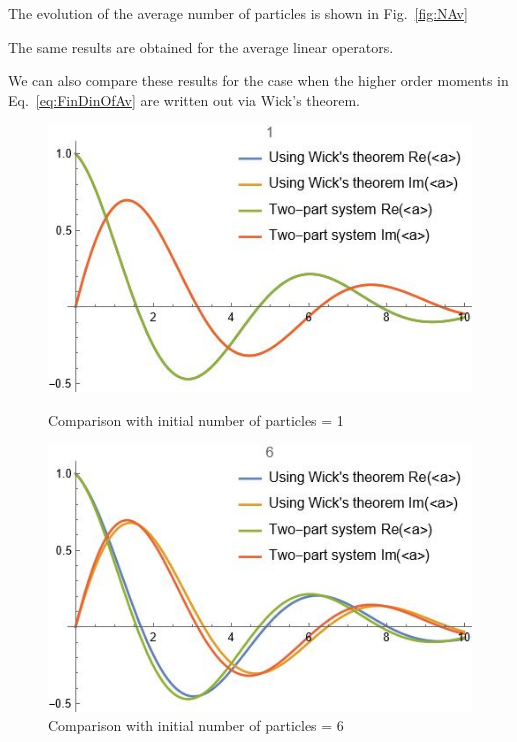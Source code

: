 \documentclass[12pt]{article}
\theoremstyle{definition}
\begin{document}
	The evolution of the average number of particles is shown in Fig.~\ref{fig:NAv}
	
		The same results are obtained for the average linear operators.
	
	We can also compare these results for the case when the higher order moments in Eq.~\eqref{eq:FinDinOfAv} are written out via Wick's theorem.
	
	\begin{figure}[h!]
		\begin{center}
			\begin{minipage}[h]{0.45\linewidth}
				\includegraphics[width=1\linewidth]{Wickn0=1.JPG}
				\caption{Comparison with initial number of particles = 1}
				\label{fig:wick1}
			\end{minipage}
			\hfil
			\begin{minipage}[h]{0.45\linewidth}
				\includegraphics[width=1\linewidth]{Wickn0=6.JPG}
				\caption{Comparison with initial number of particles = 6}
				\label{fig:wick6}
			\end{minipage}
		\end{center}
	\end{figure}
	
\end{document}
